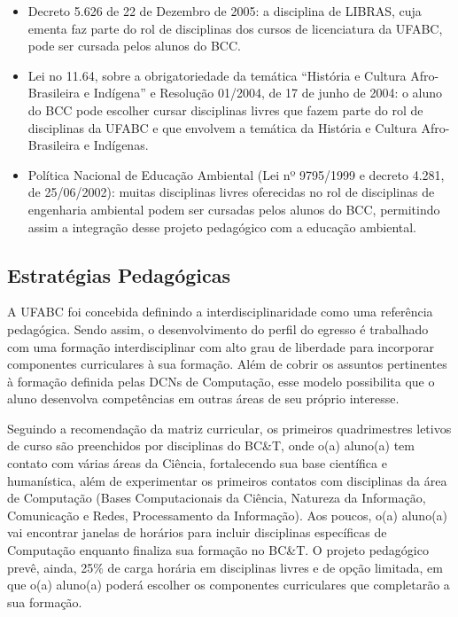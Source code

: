 \documentclass{article}
\begin{document}
\begin{itemize}

\item Decreto 5.626 de 22 de Dezembro de 2005: a disciplina de LIBRAS, cuja
ementa faz parte do rol de disciplinas dos cursos de licenciatura da UFABC, pode ser cursada pelos alunos do BCC.

\item Lei no 11.64, sobre a obrigatoriedade da temática ``História e Cultura Afro-Brasileira e Indígena'' e Resolução 01/2004, de 17 de junho de 2004: o aluno do BCC pode escolher cursar disciplinas livres que fazem parte do rol de disciplinas da UFABC e que envolvem a temática da História e Cultura Afro-Brasileira e Indígenas.

\item Política Nacional de Educação Ambiental (Lei nº 9795/1999 e decreto  4.281, de 25/06/2002): muitas disciplinas livres oferecidas no rol de disciplinas de engenharia ambiental podem ser cursadas pelos alunos do BCC, permitindo assim a integração desse projeto pedagógico com a educação ambiental.
\end{itemize}



\subsection{Estratégias Pedagógicas}

A UFABC foi concebida definindo a interdisciplinaridade como uma referência pedagógica. Sendo assim,  o desenvolvimento
do perfil do egresso é trabalhado com uma formação interdisciplinar com alto grau de liberdade para incorporar  
componentes curriculares à sua formação. Além de cobrir os assuntos pertinentes à formação definida pelas DCNs de Computação,
esse modelo possibilita que o aluno desenvolva competências em outras áreas de seu próprio interesse.

Seguindo a recomendação da matriz curricular, os primeiros quadrimestres letivos de curso são preenchidos por disciplinas do BC\&T, onde o(a) aluno(a) tem contato com várias áreas da Ciência, fortalecendo sua base científica e humanística, além de experimentar os primeiros contatos
com disciplinas da área de Computação (Bases Computacionais da Ciência, Natureza da Informação, Comunicação e Redes, Processamento da Informação). Aos poucos, o(a) aluno(a) vai encontrar janelas de horários para incluir disciplinas específicas de Computação enquanto finaliza sua formação no BC\&T. O projeto pedagógico prevê, ainda, 25\% de carga horária em disciplinas livres e de opção limitada, em que o(a) aluno(a) poderá escolher os componentes curriculares que completarão a sua formação.
\end{document}
